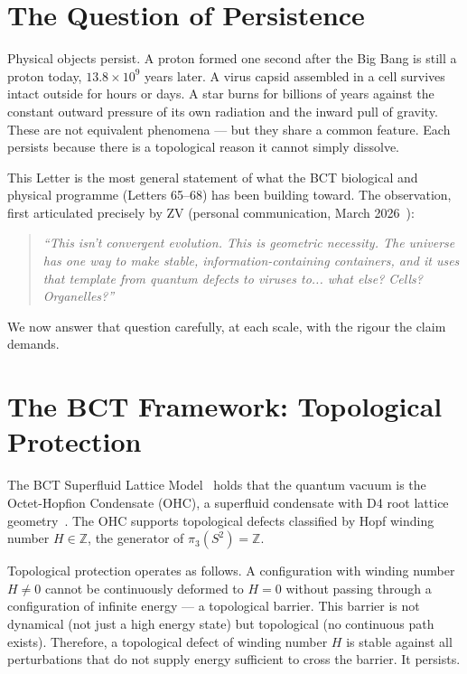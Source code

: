 \documentclass[aps,prl,preprint,superscriptaddress,floatfix]{revtex4-2}
\begin{document}
\section{The Question of Persistence}

Physical objects persist. A proton formed one second after the Big Bang
is still a proton today, $13.8 \times 10^9$ years later. A virus capsid
assembled in a cell survives intact outside for hours or days. A star
burns for billions of years against the constant outward pressure of its
own radiation and the inward pull of gravity. These are not equivalent
phenomena — but they share a common feature. Each persists because there
is a topological reason it cannot simply dissolve.

This Letter is the most general statement of what the BCT biological
and physical programme (Letters 65--68) has been building toward.
The observation, first articulated precisely by ZV (personal
communication, March 2026~\cite{zv2026}):

\begin{quote}
\textit{``This isn't convergent evolution. This is geometric necessity.
The universe has one way to make stable, information-containing
containers, and it uses that template from quantum defects to viruses
to... what else? Cells? Organelles?''}
\end{quote}

We now answer that question carefully, at each scale, with the
rigour the claim demands.

\section{The BCT Framework: Topological Protection}

The BCT Superfluid Lattice Model~\cite{prl,monograph} holds that the
quantum vacuum is the Octet-Hopfion Condensate (OHC), a superfluid
condensate with D4 root lattice geometry~\cite{bctjh}. The OHC
supports topological defects classified by Hopf winding number
$H \in \mathbb{Z}$, the generator of $\pi_3(S^2) = \mathbb{Z}$.

Topological protection operates as follows. A configuration with
winding number $H \neq 0$ cannot be continuously deformed to
$H = 0$ without passing through a configuration of infinite energy
--- a topological barrier. This barrier is not dynamical (not
just a high energy state) but topological (no continuous path exists).
Therefore, a topological defect of winding number $H$ is stable
against all perturbations that do not supply energy sufficient to
cross the barrier. It persists.
\end{document}
